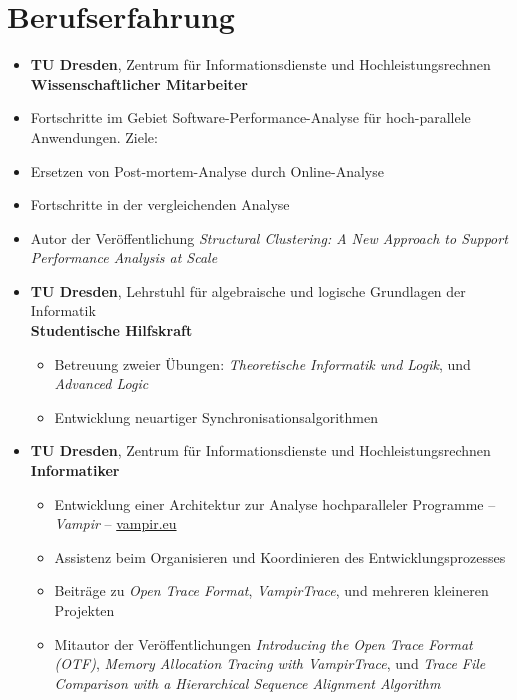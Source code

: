 \section*{Berufserfahrung}
\begin{itemize}
	\item {}
		\textbf{TU Dresden}, Zentrum f\"ur Informationsdienste und Hochleistungsrechnen \\
		\textbf{Wissenschaftlicher Mitarbeiter}
		\item Fortschritte im Gebiet Software-Performance-Analyse f\"ur hoch-parallele Anwendungen. Ziele:
			\item \hspace{1em} Ersetzen von Post-mortem-Analyse durch Online-Analyse
			\item \hspace{1em} Fortschritte in der vergleichenden Analyse
		\item Autor der Ver\"offentlichung \emph{Structural Clustering: A New Approach to Support Performance Analysis at Scale}
	\item {}
		\textbf{TU Dresden}, Lehrstuhl f\"ur algebraische und logische Grundlagen der Informatik \\
		\textbf{Studentische Hilfskraft}
		\begin{itemize}
			\item Betreuung zweier \"Ubungen: \textit{Theoretische Informatik und Logik}, und \textit{Advanced Logic}
			\item Entwicklung neuartiger Synchronisationsalgorithmen
		\end{itemize}
	\item {}
		\textbf{TU Dresden}, Zentrum f\"ur Informationsdienste und Hochleistungsrechnen \\
		\textbf{Informatiker}
		\begin{itemize}
			\item Entwicklung einer Architektur zur Analyse hochparalleler Programme -- \emph{Vampir} -- \href{http://www.vampir.eu}{vampir.eu}
			\item Assistenz beim Organisieren und Koordinieren des Entwicklungsprozesses
			\item Beitr\"age zu \emph{Open Trace Format}, \emph{VampirTrace}, und mehreren kleineren Projekten
			\item Mitautor der Ver\"offentlichungen \emph{Introducing the Open Trace Format (OTF)}, 
			\emph{Memory Allocation Tracing with VampirTrace}, und \emph{Trace File Comparison with a Hierarchical Sequence Alignment Algorithm}
		\end{itemize}
\end{itemize}

